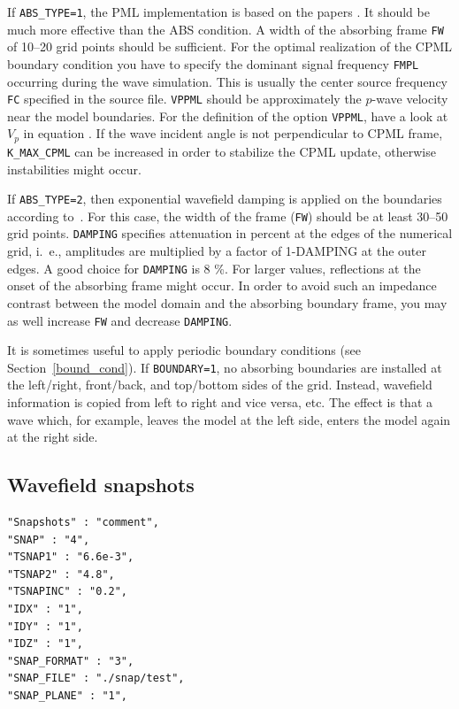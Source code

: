 \documentclass{hitec}
\newcommand{\option}[1]{\texttt{#1}}
\begin{document}
If \option{ABS\_TYPE=1}, the PML implementation is based on the papers
\cite{collino:01,komatitsch:07,martin:09}. It should be
much more effective than the ABS condition. A width of the absorbing frame
\option{FW} of 10--20 grid points should be sufficient. For the optimal
realization of the CPML boundary condition you have to specify the dominant
signal frequency \option{FMPL} occurring during the wave simulation. This is
usually the center source frequency \option{FC} specified in the source file.
\option{VPPML} should be approximately the $p$-wave velocity near the model
boundaries. For the definition of the option \option{VPPML}, have a look at
$V_p$ in equation . If the wave incident angle is not perpendicular
to CPML frame, \option{K\_MAX\_CPML} can be increased in order to stabilize the
CPML update, otherwise instabilities might occur.

If \option{ABS\_TYPE=2}, then exponential wavefield damping is applied on the
boundaries according to~\cite{cerjan:85}. For this case, the width of the frame
(\option{FW}) should be at least 30--50 grid points. \option{DAMPING} specifies
attenuation in percent at the edges of the numerical grid, i.\ e., amplitudes
are multiplied by a factor of 1-DAMPING at the outer edges. A good choice for
\option{DAMPING} is 8 \%. For larger values, reflections at the onset of the
absorbing frame might occur. In order to avoid such an impedance contrast
between the model domain and the absorbing boundary frame, you may as well
increase \option{FW} and decrease \option{DAMPING}.

It is sometimes useful to apply periodic boundary conditions (see
Section~\ref{bound_cond}). If \texttt{BOUNDARY=1}, no absorbing boundaries are
installed at the left/right, front/back, and top/bottom sides of the grid.
Instead, wavefield information is copied from left to right and vice versa,
etc. The effect is that a wave which, for example, leaves the model at the left
side, enters the model again at the right side.

\subsection{Wavefield snapshots}
\begin{verbatim}
"Snapshots" : "comment",
"SNAP" : "4",
"TSNAP1" : "6.6e-3",
"TSNAP2" : "4.8",
"TSNAPINC" : "0.2",
"IDX" : "1",
"IDY" : "1",
"IDZ" : "1",
"SNAP_FORMAT" : "3",
"SNAP_FILE" : "./snap/test",
"SNAP_PLANE" : "1",
\end{verbatim}
\end{document}
